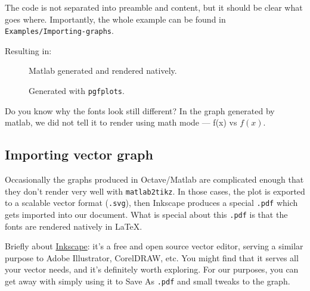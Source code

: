 The code is not separated into preamble and content, but it should be clear what goes where.
Importantly, the whole example can be found in \texttt{Examples/Importing-graphs}.

Resulting in:
\begin{figure}[h]\centering
\begin{minipage}{0.49\textwidth}
    \newlength\fheight{} \newlength\fwidth{}
    \setlength\fheight{5.5cm}
    \setlength\fwidth{7cm}    

\caption{Matlab generated and rendered natively.}
\end{minipage}
\hfill
\begin{minipage}{0.49\textwidth}
    \caption{Generated with \texttt{pgfplots}.}
\end{minipage}
\end{figure}

Do you know why the fonts look still different? In the graph generated by matlab, we did not tell it to render using math mode --- f(x) vs \( f(x) \).

\subsection{Importing vector graph}
Occasionally the graphs produced in Octave/Matlab are complicated enough that they don't render very well with \texttt{matlab2tikz}.
In those cases, the plot is exported to a scalable vector format (\texttt{.svg}), then Inkscape produces a special \texttt{.pdf} which gets imported into our document.
What is special about this \texttt{.pdf} is that the fonts are rendered natively in \LaTeX.

Briefly about \href{https://inkscape.org/}{Inkscape}: it's a free and open source vector editor, serving a similar purpose to Adobe Illustrator, CorelDRAW, etc.
You might find that it serves all your vector needs, and it's definitely worth exploring.
For our purposes, you can get away with simply using it to Save As \texttt{.pdf} and small tweaks to the graph.

